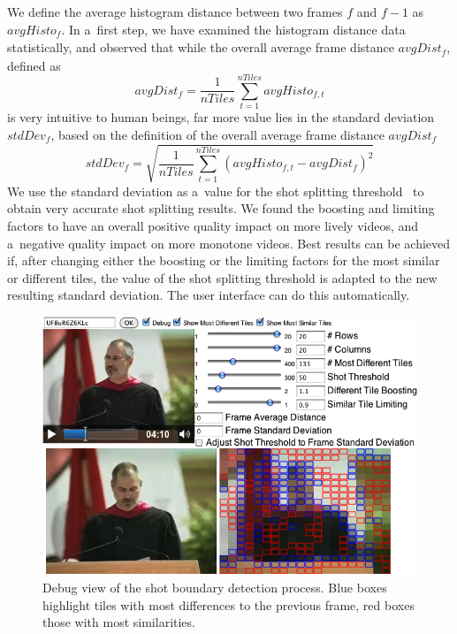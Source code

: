 We define the average histogram distance between two frames
$\mathit{f}$ and $\mathit{f - 1}$ as $\mathit{avgHisto_{f}}$.
In a~first step, we have examined the histogram distance
data statistically, and observed that while
the overall average frame distance $\mathit{avgDist_{f}}$,
defined as $$\mathit{avgDist_{f}} =
\frac{1}{\mathit{nTiles}}\sum_{t=1}^{\mathit{nTiles}}
\mathit{avgHisto_{f, t}}$$ is very intuitive to human beings,
far more value lies in the standard deviation
$\mathit{stdDev_{f}}$, based on the definition of the overall
average frame distance $\mathit{avgDist_{f}}$
$$\mathit{stdDev_{f}} =
\sqrt{\frac{1}{\mathit{nTiles}}\sum_{t=1}^{\mathit{nTiles}}
(\mathit{avgHisto_{f, t}} - \mathit{avgDist_{f}})^{2}}$$
We use the standard deviation as a~value for the shot splitting
threshold~\cite{lienhart1999comparison}
to obtain very accurate shot splitting results.
We found the boosting and limiting factors to have an overall
positive quality impact on more lively videos,
and a~negative quality impact on more monotone videos.
Best results can be achieved if,
after changing either the boosting or the limiting factors
for the most similar or different tiles,
the value of the shot splitting threshold is adapted
to the new resulting standard deviation.
The user interface can do this automatically.

\begin{figure}
  \begin{center}
    \includegraphics[width=1.0\linewidth]{./algorithm.png}
  \end{center}
  \caption[Debug view of the shot boundary detection process]
    {Debug view of the shot boundary detection process.
    Blue boxes highlight tiles with most differences
    to the previous frame, red boxes those with most similarities.}
  \label{fig:algorithm}
\end{figure}

